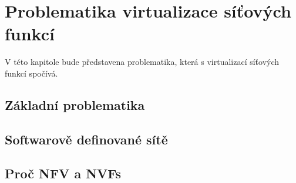 \chapter{Problematika virtualizace síťových funkcí}

V této kapitole bude představena problematika, která s virtualizací síťových funkcí spočívá.

\section{Základní problematika}\label{sub:interaction}

\section{Softwarově definované sítě}\label{sub:interaction}

\section{Proč NFV a NVFs}\label{sub:interaction}



